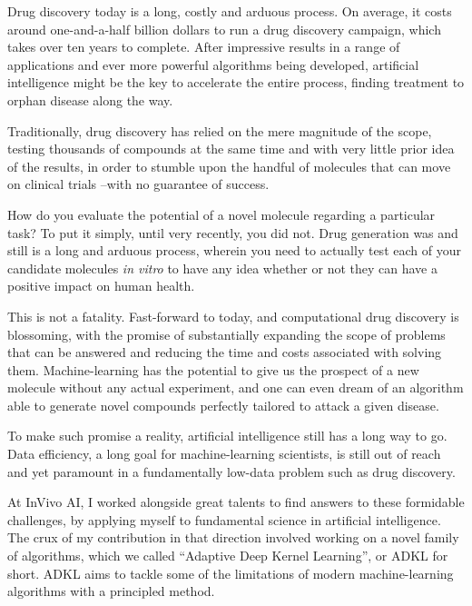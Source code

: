 \documentclass[11pt]{article}
\numberwithin{equation}{subsection}
\begin{document}
Drug discovery today is a long, costly and arduous process. On average, it costs around one-and-a-half billion dollars to run a drug discovery campaign, which takes over ten years to complete. After impressive results in a range of applications and ever more powerful algorithms being developed, artificial intelligence might be the key to accelerate the entire process, finding treatment to orphan disease along the way.

Traditionally, drug discovery has relied on the mere magnitude of the scope, testing thousands of compounds at the same time and with very little prior idea of the results, in order to stumble upon the handful of molecules that can move on clinical trials –with no guarantee of success.

How do you evaluate the potential of a novel molecule regarding a particular task? To put it simply, until very recently, you did not. Drug generation was and still is a long and arduous process, wherein you need to actually test each of your candidate molecules \textit{in vitro} to have any idea whether or not they can have a positive impact on human health.

This is not a fatality. Fast-forward to today, and computational drug discovery is blossoming, with the promise of substantially expanding the scope of problems that can be answered and reducing the time and costs associated with solving them. Machine-learning has the potential to give us the prospect of a new molecule without any actual experiment, and one can even dream of an algorithm able to generate novel compounds perfectly tailored to attack a given disease.


To make such promise a reality, artificial intelligence still has a long way to go. Data efficiency, a long goal for machine-learning scientists, is still out of reach and yet paramount in a fundamentally low-data problem such as drug discovery.

At InVivo AI, I worked alongside great talents to find answers to these formidable challenges, by applying myself to fundamental science in artificial intelligence. The crux of my contribution in that direction involved working on a novel family of algorithms, which we called ``Adaptive Deep Kernel Learning'', or ADKL for short. ADKL aims to tackle some of the limitations of modern machine-learning algorithms with a principled method.
\end{document}
